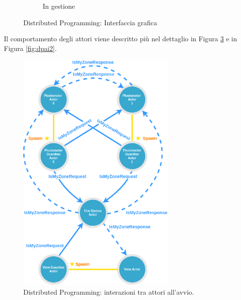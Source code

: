 \documentclass[12pt,a4paper,openright,twoside]{book}
\begin{document}
\begin{figure}
\begin{subfigure}[b]{0.3\textwidth}
         \caption{In gestione}
         \label{fig:dpguic}
     \end{subfigure}
        \caption{Distributed Programming: Interfaccia grafica}
        \label{fig:dpgui}
\end{figure}

Il comportamento degli attori viene descritto più nel dettaglio in Figura \ref{fig:dpai1} e in Figura \ref{fig:dpai2}.

\begin{figure}
	\centering
	\includegraphics[width=0.7\textwidth]{figures/distributed-programming-actors-interactions1.png}
	\caption{Distributed Programming: interazioni tra attori all'avvio.}
	\label{fig:dpai1}
\end{figure}
\end{document}
